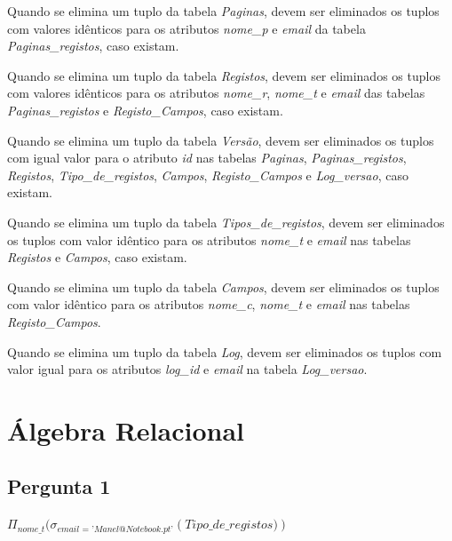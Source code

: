 \documentclass[11pt,a4paper]{article}
\begin{document}
\begin{description}[itemsep=1.5em]
  \item[RI15]Quando se elimina um tuplo da tabela \textit{Paginas}, devem ser eliminados os
tuplos com valores id\^{e}nticos para os atributos \textit{nome\_p} e \textit{email} da tabela \textit{Paginas\_registos}, caso existam.

  \item[RI16] Quando se elimina um tuplo da tabela \textit{Registos}, devem ser eliminados os
tuplos com valores id\^{e}nticos para os atributos \textit{nome\_r}, \textit{nome\_t} e \textit{email} das
tabelas \textit{Paginas\_registos} e \textit{Registo\_Campos}, caso existam.

  \item[RI17]Quando se elimina um tuplo da tabela \textit{Vers\~{a}o}, devem ser eliminados os
tuplos com igual valor para o atributo \textit{id} nas tabelas \textit{Paginas}, \textit{Paginas\_registos},
\textit{Registos}, \textit{Tipo\_de\_registos}, \textit{Campos}, \textit{Registo\_Campos} e \textit{Log\_versao}, caso existam.


  \item[RI18] Quando se elimina um tuplo da tabela \textit{Tipos\_de\_registos}, devem ser
eliminados os tuplos com valor id\^{e}ntico para os atributos \textit{nome\_t} e \textit{email} nas
tabelas \textit{Registos} e \textit{Campos}, caso existam.

  \item[RI19] Quando se elimina um tuplo da tabela \textit{Campos}, devem ser eliminados os
tuplos com valor id\^{e}ntico para os atributos \textit{nome\_c}, \textit{nome\_t} e \textit{email} nas tabelas
\textit{Registo\_Campos}.

  \item[RI20]Quando se elimina um tuplo da tabela \textit{Log}, devem ser eliminados os tuplos
com valor igual para os atributos \textit{log\_id} e \textit{email} na tabela \textit{Log\_versao}.
  
\end{description}


\newpage
\section{\'{A}lgebra Relacional}
\subsection{Pergunta 1}

$\Pi_{\textit{nome\_t}}(\sigma_{\textit{email = 'Manel@Notebook.pt'}}(\textit{Tipo\_de\_registos)})$
\end{document}

